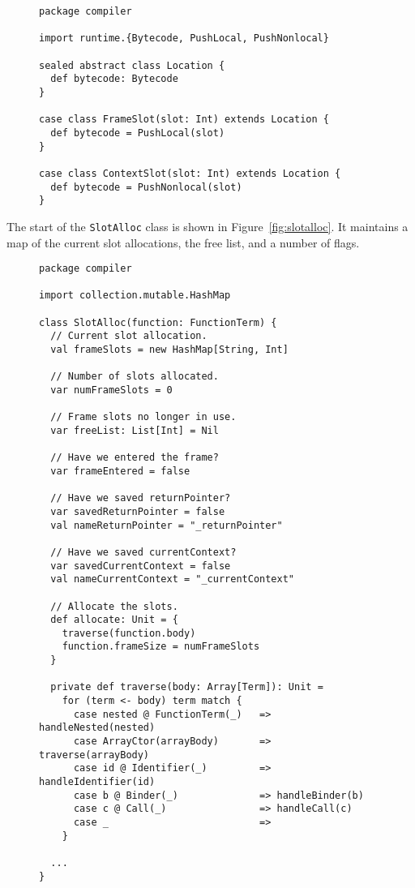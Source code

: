 \begin{figure}
\begin{verbatim}
package compiler

import runtime.{Bytecode, PushLocal, PushNonlocal}

sealed abstract class Location {
  def bytecode: Bytecode
}

case class FrameSlot(slot: Int) extends Location {
  def bytecode = PushLocal(slot)
}

case class ContextSlot(slot: Int) extends Location {
  def bytecode = PushNonlocal(slot)
}
\end{verbatim}
\getcaption
\end{figure}

The start of the \verb!SlotAlloc! class
is shown in Figure~\ref{fig:slotalloc}.
It maintains a map of the current slot allocations, the free list,
and a number of flags.

\begin{figure}
\begin{verbatim}
package compiler

import collection.mutable.HashMap

class SlotAlloc(function: FunctionTerm) {
  // Current slot allocation.
  val frameSlots = new HashMap[String, Int]

  // Number of slots allocated.
  var numFrameSlots = 0

  // Frame slots no longer in use.
  var freeList: List[Int] = Nil

  // Have we entered the frame?
  var frameEntered = false

  // Have we saved returnPointer?
  var savedReturnPointer = false
  val nameReturnPointer = "_returnPointer"

  // Have we saved currentContext?
  var savedCurrentContext = false
  val nameCurrentContext = "_currentContext"

  // Allocate the slots.
  def allocate: Unit = {
    traverse(function.body)
    function.frameSize = numFrameSlots
  }

  private def traverse(body: Array[Term]): Unit =
    for (term <- body) term match {
      case nested @ FunctionTerm(_)   => handleNested(nested)
      case ArrayCtor(arrayBody)       => traverse(arrayBody)
      case id @ Identifier(_)         => handleIdentifier(id)
      case b @ Binder(_)              => handleBinder(b)
      case c @ Call(_)                => handleCall(c)
      case _                          =>
    }

  ...
}
\end{verbatim}
\getcaption
\end{figure}

